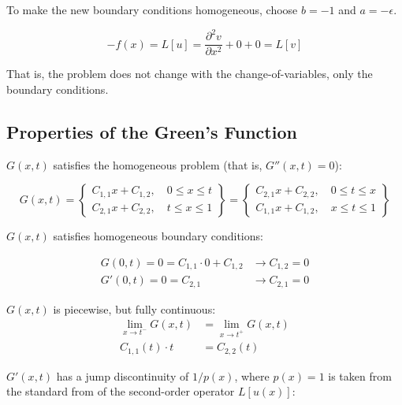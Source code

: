 \documentclass[10pt]{article}
\begin{document}
To make the new boundary conditions homogeneous, choose $b=-1$ and $a=-\epsilon$.

$$
-f(x) = L[u] = \frac{\partial^2 v}{\partial x^2} + 0 + 0 = L[v]
$$

That is, the problem does not change with the change-of-variables, only the boundary conditions.

\subsection{Properties of the Green's Function}
$$\quad$$
$G(x,t)$ satisfies the homogeneous problem (that is, $G''(x,t) = 0$):
    
\begin{equation}
G(x,t) = 
 \left\{ \begin{matrix}
    C_{1,1} x + C_{1,2}, \quad 0 \le x \le t \\ 
    C_{2,1} x + C_{2,2}, \quad t \le x \le 1
    \end{matrix} \right\}
    =
    \left\{ \begin{matrix}
    C_{2,1} x + C_{2,2}, \quad 0 \le t \le x \\ 
    C_{1,1} x + C_{1,2}, \quad x \le t \le 1
    \end{matrix} \right\} 
\end{equation}

$G(x,t)$ satisfies homogeneous boundary conditions:
    
\begin{equation}
 \begin{split}
  G(0,t) = 0 = C_{1,1} \cdot 0 + C_{1,2}  &\xrightarrow{ } C_{1,2} = 0 \\
  G'(0,t) = 0 = C_{2,1} \quad \quad  &\xrightarrow{ } C_{2,1} = 0
 \end{split}
\end{equation}

$G(x,t)$ is piecewise, but fully continuous:
\begin{equation}
\label{eqn:continuous}
\begin{split}
    \lim _{ x \rightarrow t^- }{G(x,t)} &= \lim _{ x \rightarrow t^+ }{G(x,t)} \\
    C_{1,1}(t)\cdot t &= C_{2,2}(t)
\end{split}
\end{equation}

$G'(x,t)$ has a jump discontinuity of $1/p(x)$, where $p(x)=1$ is taken from the standard from of the second-order operator $L[u(x)]$:
    
\end{document}
